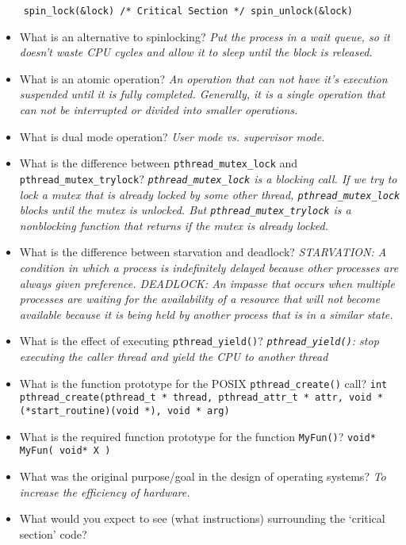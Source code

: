 \documentclass[10pt,landscape]{article}
\begin{document}
\begin{multicols}{4}
\begin{verbatim}
    spin_lock(&lock) /* Critical Section */ spin_unlock(&lock)
\end{verbatim}

\begin{itemize}
    \item What is an alternative to spinlocking?  \textit{Put the process in a wait queue, so it doesn't waste CPU cycles and allow it to sleep until the block is released.}
    \item What is an atomic operation? \textit{An operation that can not have it's execution suspended until it is fully completed. Generally, it is a single operation that can not be interrupted or divided into smaller operations.}
    \item What is dual mode operation? \textit{User mode vs. supervisor mode.}
    \item What is the difference between \verb$pthread_mutex_lock$ and \verb$pthread_mutex_trylock$? \textit{\texttt{pthread\_mutex\_lock} is a blocking call. If we try to lock a mutex that is already locked by some other thread, \texttt{pthread\_mutex\_lock} blocks until the mutex is unlocked. But \texttt{pthread\_mutex\_trylock} is a nonblocking function that returns if the mutex is already locked.}
    \item What is the difference between starvation and deadlock?  \textit{STARVATION: A condition in which a process is indefinitely delayed because other processes are always given preference. DEADLOCK: An impasse that occurs when multiple processes are waiting for the availability of a resource that will not become available because it is being held by another process that is in a similar state.}
    \item What is the effect of executing \verb$pthread_yield()$?  \textit{\texttt{pthread\_yield()}: stop executing the caller thread and yield the CPU to another thread}
    \item What is the function prototype for the POSIX \verb$pthread_create()$ call? \texttt{int pthread\_create(pthread\_t  *  thread, pthread\_attr\_t * attr, void * (*start\_routine)(void *), void * arg)}

    \item What is the required function prototype for the function \verb|MyFun()|? \verb|void* MyFun( void* X )|
    \item What was the original purpose/goal in the design of operating systems? \textit{To increase the efficiency of hardware.}
    \item What would you expect to see (what instructions) surrounding the `critical section' code?
\end{itemize}


\end{multicols}
\end{document}
